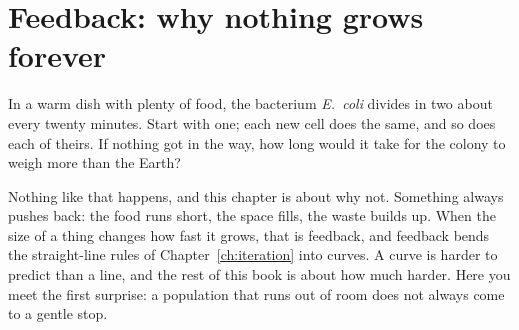 
\chapter{Feedback: why nothing grows forever}
\label{ch:feedback}

\noindent
In a warm dish with plenty of food, the bacterium \emph{E.~coli} divides in
two about every twenty minutes. Start with one; each new cell does the
same, and so does each of theirs. If nothing got in the way, how long would
it take for the colony to weigh more than the Earth?

Nothing like that happens, and this chapter is about why not. Something
always pushes back: the food runs short, the space fills, the waste builds
up. When the size of a thing changes how fast it grows, that is feedback,
and feedback bends the straight-line rules of Chapter~\ref{ch:iteration}
into curves. A curve is harder to predict than a line, and the rest of this
book is about how much harder. Here you meet the first surprise: a
population that runs out of room does not always come to a gentle stop.

